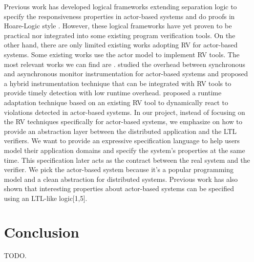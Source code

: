 \documentclass[format=acmsmall, nonacm=true, review=true, screen=true]{acmart}
\begin{document}
Previous work has developed logical frameworks extending separation logic to specify the responsiveness properties in actor-based systems and do proofs in Hoare-Logic style \cite{actorservice, parthasarathy2018modular}.
However, these logical frameworks have yet proven to be practical nor integrated into some existing program verification tools.
On the other hand, there are only limited existing works adopting RV for actor-based systems.
Some existing works \cite{shafiei2020actor,lavery2017actor} use the actor model to implement RV tools.
The most relevant works we can find are \cite{cassar2015synchronous,cassar2015runtime}.
\cite{cassar2015synchronous} studied the overhead between synchronous and asynchronous monitor instrumentation for actor-based systems and proposed a hybrid instrumentation technique that can be  integrated with RV tools to provide timely detection with low runtime overhead.
\cite{cassar2015runtime} proposed a runtime adaptation technique based on an existing RV tool to dynamically react to violations detected in actor-based systems.
In our project, instead of focusing on the RV techniques specifically for actor-based systems, we emphasize on how to provide an abstraction layer between the distributed application and the LTL verifiers.
We want to provide an expressive specification language to help users model their application domains and specify the system's properties at the same time. This specification later acts as the contract between the real system and the verifier.
We pick the actor-based system because it's a popular programming model and a clean abstraction for distributed systems.
Previous work has also shown that interesting properties about actor-based systems can be specified using an LTL-like logic[1,5].

\section{Conclusion}

TODO.



\end{document}
